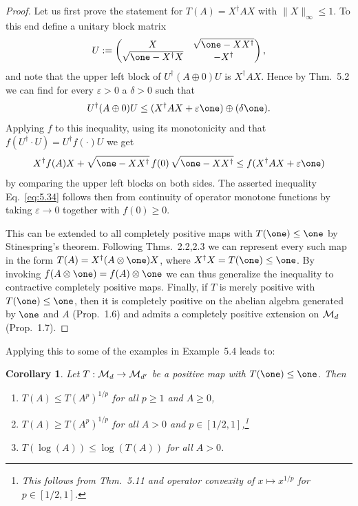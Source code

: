 \documentclass[11pt,a4paper]{article}
\theoremstyle{plain}
\newtheorem{corollary}{Corollary}[section]
\theoremstyle{definition}
\theoremstyle{remark}
\numberwithin{equation}{section}
\begin{document}
\begin{proof}
    Let us first prove the statement for $T(A)=X^\dagger A X$ with $\|X\|_\infty \le 1$.
    To this end define a unitary block matrix
    \begin{equation}\label{eq:5.35}
        U :=
        \begin{pmatrix}
            X                       &\sqrt{\one-XX^\dagger}\\
            \sqrt{\one-X^\dagger X} &-X^\dagger
        \end{pmatrix},
    \end{equation}
    and note that the upper left block of $U^\dagger(A\oplus 0)U$ is $X^\dagger A X$.
    Hence by Thm.~5.2 we can find for every $\varepsilon>0$ a $\delta>0$ such that
    \[
        U^\dagger(A\oplus 0)U \le (X^\dagger A X + \varepsilon \one)\oplus (\delta \one).
    \]
    Applying $f$ to this inequality, using its monotonicity and that
    $f(U^\dagger \cdot U)=U^\dagger f(\cdot) U$ we get
    \begin{equation}\label{eq:5.36}
        X^\dagger f(A)X
        + \sqrt{\one-XX^\dagger}\, f(0)\, \sqrt{\one-XX^\dagger}
        \le f(X^\dagger A X + \varepsilon \one)
    \end{equation}
    by comparing the upper left blocks on both sides. The asserted inequality
    Eq.~\eqref{eq:5.34} follows then from continuity of operator monotone functions by
    taking $\varepsilon \to 0$ together with $f(0)\ge 0$.

    This can be extended to all completely positive maps with $T(\one)\le \one$ by
    Stinespring's theorem. Following Thms.~2.2,2.3 we can represent every such map in the
    form $T(A)=X^\dagger(A\otimes \one)X$, where $X^\dagger X=T(\one)\le \one$. By
    invoking $f(A\otimes \one)=f(A)\otimes \one$ we can thus generalize the inequality to
    contractive completely positive maps. Finally, if $T$ is merely positive with
    $T(\one)\le \one$, then it is completely positive on the abelian algebra generated by
    $\one$ and $A$ (Prop.~1.6) and admits a completely positive extension on $\mathcal{M}_d$
    (Prop.~1.7).
\end{proof}

Applying this to some of the examples in Example~5.4 leads to:

\begin{corollary}
    Let $T:\mathcal{M}_d\to \mathcal{M}_{d'}$ be a positive map with $T(\one)\le \one$. Then
    \begin{enumerate}
        \item $T(A) \le T(A^p)^{1/p}$ for all $p\ge 1$ and $A\ge 0$,
        \item $T(A) \ge T(A^p)^{1/p}$ for all $A>0$ and $p\in[1/2,1]$,\footnote{This follows
                  from Thm.~5.11 and operator convexity of $x\mapsto x^{1/p}$ for $p\in[1/2,1]$.}
        \item $T(\log(A)) \le \log(T(A))$ for all $A>0$.
    \end{enumerate}
\end{corollary}
\end{document}
